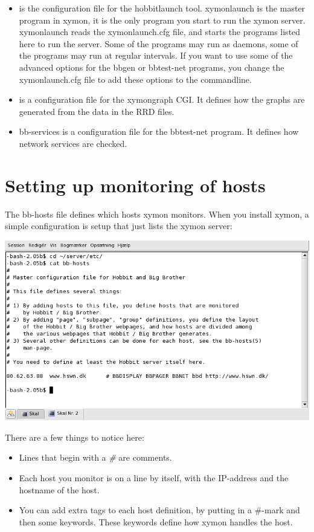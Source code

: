 \begin{itemize}
\item {} is the configuration file for the hobbitlaunch
  tool. xymonlaunch is the master program in xymon, it is the only
  program you start to run the xymon server. xymonlaunch reads the
  xymonlaunch.cfg file, and starts the programs listed here to run
  the server. Some of the programs may run as daemons, some of the
  programs may run at regular intervals. If you want to use some of
  the advanced options for the bbgen or bbtest-net programs, you
  change the xymonlaunch.cfg file to add these options to the
  commandline.

\item {} is a configuration file for
  the xymongraph  CGI. It defines how the graphs are generated from
  the data in the  RRD files.



\item bb-services is a configuration file for the bbtest-net
  program. It defines how network services are checked.


\end{itemize}

\section{Setting up monitoring of hosts}


 The bb-hosts file defines which hosts xymon monitors. When you
 install xymon, a simple configuration is setup that just lists the
 xymon server: 

\includegraphics[scale=0.5]{./xymon-bbhosts.png} 


 There are a few things to notice here:
\begin{itemize}
\item Lines that begin with a \emph{\#}
 are comments.
\item Each host you monitor is on a line by itself, with the
  IP-address and the hostname of the host.

\item You can add extra tags to each host definition, by putting in a
  \#-mark and then some keywords. These keywords define how xymon
  handles the host.



\end{itemize}


